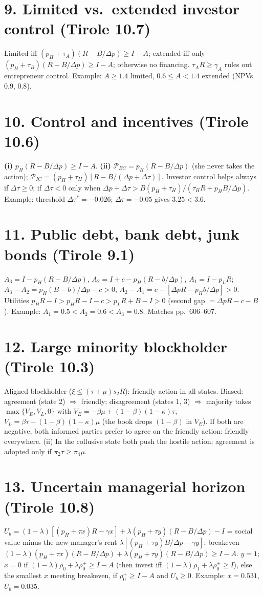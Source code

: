 \documentclass[11pt,a4paper]{article}
\newcommand{\dpp}{\Delta p}
\begin{document}
\section*{9. Limited vs.\ extended investor control (Tirole 10.7)}
Limited iff $(p_H+\tau_A)(R-B/\dpp)\ge I-A$; extended iff only $(p_H+\tau_B)(R-B/\dpp)\ge I-A$;
otherwise no financing. $\tau_AR\ge\gamma_A$ rules out entrepreneur control. Example: $A\ge1.4$
limited, $0.6\le A<1.4$ extended (NPVs $0.9$, $0.8$).

\section*{10. Control and incentives (Tirole 10.6)}
\textbf{(i)} $p_H(R-B/\dpp)\ge I-A$.
\textbf{(ii)} $\mathcal P_{EC}=p_H(R-B/\dpp)$ (she never takes the action);
$\mathcal P_{IC}=(p_H+\tau_H)[R-B/(\dpp+\Delta\tau)]$. Investor control helps always if
$\Delta\tau\ge0$; if $\Delta\tau<0$ only when $\dpp+\Delta\tau>B(p_H+\tau_H)/(\tau_HR+p_HB/\dpp)$.
Example: threshold $\Delta\tau^*=-0.026$; $\Delta\tau=-0.05$ gives $3.25<3.6$.

\section*{11. Public debt, bank debt, junk bonds (Tirole 9.1)}
$A_3=I-p_H(R-B/\dpp)$, $A_2=I+c-p_H(R-b/\dpp)$, $A_1=I-p_LR$;
$A_3-A_2=p_H(B-b)/\dpp-c>0$, $A_2-A_1=c-[\dpp R-p_Hb/\dpp]>0$. Utilities
$p_HR-I>p_HR-I-c>p_LR+B-I>0$ (second gap $=\dpp R-c-B$). Example: $A_1=0.5<A_2=0.6<A_3=0.8$.
Matches pp.~606--607.

\section*{12. Large minority blockholder (Tirole 10.3)}
Aligned blockholder ($\xi\le(\tau+\mu)s_2R$): friendly action in all states. Biased: agreement
(state 2) $\Rightarrow$ friendly; disagreement (states 1, 3) $\Rightarrow$ majority takes
$\max\{V_E,V_L,0\}$ with $V_E=-\beta\mu+(1-\beta)(1-\kappa)\tau$, $V_L=\beta\tau-(1-\beta)(1-\kappa)\mu$
(the book drops $(1-\beta)$ in $V_E$). If both are negative, both informed parties prefer to agree on the
friendly action: friendly everywhere. (ii) In the collusive state both push the hostile action;
agreement is adopted only if $\pi_2\tau\ge\pi_4\mu$.

\section*{13. Uncertain managerial horizon (Tirole 10.8)}
$U_b=(1-\lambda)[(p_H+\tau x)R-\gamma x]+\lambda(p_H+\tau y)(R-B/\dpp)-I$ = social value minus the
new manager's rent $\lambda[(p_H+\tau y)B/\dpp-\gamma y]$; breakeven
$(1-\lambda)(p_H+\tau x)(R-B/\dpp)+\lambda(p_H+\tau y)(R-B/\dpp)\ge I-A$. $y=1$; $x=0$ if
$(1-\lambda)\rho_0+\lambda\rho_0^+\ge I-A$ (then invest iff $(1-\lambda)\rho_1+\lambda\rho_0^+\ge I$), else
the smallest $x$ meeting breakeven, if $\rho_0^+\ge I-A$ and $U_b\ge0$. Example: $x=0.531$,
$U_b=0.035$.
\end{document}
